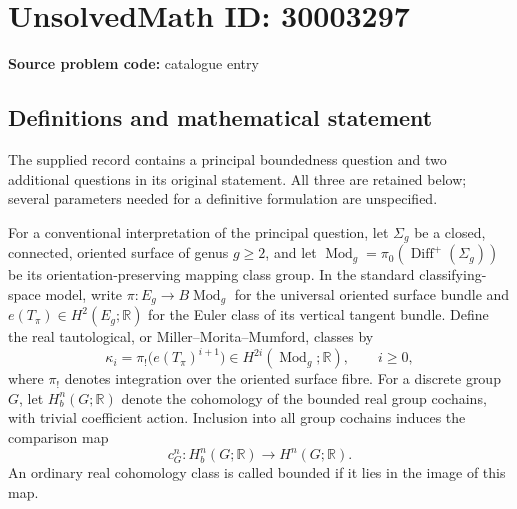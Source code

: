 \documentclass[11pt]{article}
\newcommand{\R}{\mathbb{R}}
\begin{document}
\section*{UnsolvedMath ID: 30003297}
\textbf{Source problem code:} catalogue entry
\subsection{Definitions and mathematical statement}
The supplied record contains a principal boundedness question and two additional questions in its original statement. All three are retained below; several parameters needed for a definitive formulation are unspecified.

For a conventional interpretation of the principal question, let \(\Sigma_g\) be a closed, connected, oriented surface of genus \(g\geq 2\), and let \(\operatorname{Mod}_g=\pi_0(\operatorname{Diff}^{+}(\Sigma_g))\) be its orientation-preserving mapping class group. In the standard classifying-space model, write \(\pi:E_g\to B\operatorname{Mod}_g\) for the universal oriented surface bundle and \(e(T_\pi)\in H^2(E_g;\R)\) for the Euler class of its vertical tangent bundle. Define the real tautological, or Miller--Morita--Mumford, classes by
\[
\kappa_i=\pi_!\bigl(e(T_\pi)^{i+1}\bigr)\in H^{2i}(\operatorname{Mod}_g;\R),\qquad i\geq 0,
\]
where \(\pi_!\) denotes integration over the oriented surface fibre. For a discrete group \(G\), let \(H_b^n(G;\R)\) denote the cohomology of the bounded real group cochains, with trivial coefficient action. Inclusion into all group cochains induces the comparison map
\[
c_G^n:H_b^n(G;\R)\longrightarrow H^n(G;\R).
\]
An ordinary real cohomology class is called bounded if it lies in the image of this map.
\end{document}
